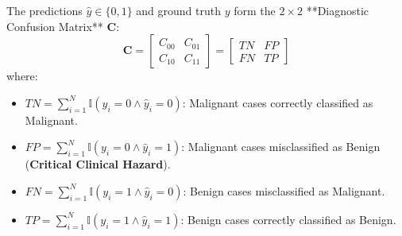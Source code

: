 \documentclass[11pt,a4paper]{article}
\begin{document}
The predictions $\hat{y} \in \{0, 1\}$ and ground truth $y$ form the $2 \times 2$ **Diagnostic Confusion Matrix** $\mathbf{C}$:
\begin{equation}
\mathbf{C} = \begin{bmatrix}
C_{00} & C_{01} \\
C_{10} & C_{11}
\end{bmatrix} = \begin{bmatrix}
TN & FP \\
FN & TP
\end{bmatrix}
\end{equation}
where:
\begin{itemize}[noitemsep]
    \item $TN = \sum_{i=1}^N \mathbb{I}(y_i=0 \land \hat{y}_i=0)$: Malignant cases correctly classified as Malignant.
    \item $FP = \sum_{i=1}^N \mathbb{I}(y_i=0 \land \hat{y}_i=1)$: Malignant cases misclassified as Benign (\textbf{Critical Clinical Hazard}).
    \item $FN = \sum_{i=1}^N \mathbb{I}(y_i=1 \land \hat{y}_i=0)$: Benign cases misclassified as Malignant.
    \item $TP = \sum_{i=1}^N \mathbb{I}(y_i=1 \land \hat{y}_i=1)$: Benign cases correctly classified as Benign.
\end{itemize}
\end{document}
